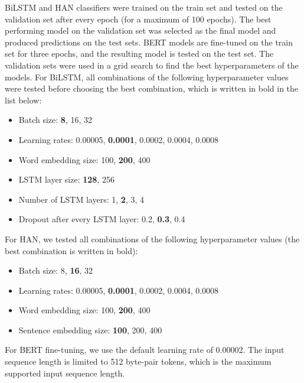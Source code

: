 \documentclass{clv3}
\begin{document}
BiLSTM and HAN classifiers were trained on the train set and tested on the validation set after every epoch (for a maximum of 100 epochs). The best performing model on the validation set was selected as the final model and produced predictions on the test sets. BERT models are fine-tuned on the train set for three epochs, and the resulting model is tested on the test set. The validation sets were used in a grid search to find the best hyperparameters of the models. For BiLSTM, all combinations of the following hyperparameter values were tested before choosing the best combination, which is written in bold in the list below:

\begin{itemize}
\item Batch size: \textbf{8}, 16, 32
\item Learning rates: 0.00005, \textbf{0.0001}, 0.0002, 0.0004, 0.0008
\item Word embedding size: 100, \textbf{200}, 400
\item LSTM layer size: \textbf{128}, 256
\item Number of LSTM layers: 1, \textbf{2}, 3, 4
\item Dropout after every LSTM layer: 0.2,  \textbf{0.3}, 0.4
\end{itemize}

For HAN, we tested all combinations of the following hyperparameter values (the best combination is written in bold):

\begin{itemize}
\item Batch size: 8, \textbf{16}, 32
\item Learning rates: 0.00005, \textbf{0.0001}, 0.0002, 0.0004, 0.0008
\item Word embedding size: 100, \textbf{200}, 400
\item Sentence embedding size: \textbf{100}, 200, 400
\end{itemize}

For BERT fine-tuning, we use the default learning rate of 0.00002. The input sequence length is limited to 512 byte-pair tokens, which is the maximum supported input sequence length.
\end{document}
